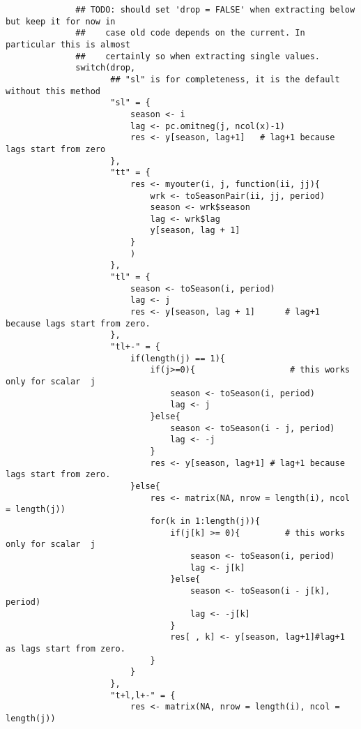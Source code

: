 \documentclass[11pt,a4paper]{article}
\begin{document}
\begin{verbatim}
              ## TODO: should set 'drop = FALSE' when extracting below but keep it for now in
              ##    case old code depends on the current. In particular this is almost
              ##    certainly so when extracting single values.
              switch(drop,
                     ## "sl" is for completeness, it is the default without this method
                     "sl" = {
                         season <- i
                         lag <- pc.omitneg(j, ncol(x)-1)
                         res <- y[season, lag+1]   # lag+1 because lags start from zero
                     },
                     "tt" = {
                         res <- myouter(i, j, function(ii, jj){
                             wrk <- toSeasonPair(ii, jj, period)
                             season <- wrk$season
                             lag <- wrk$lag
                             y[season, lag + 1]
                         }
                         )
                     },
                     "tl" = {
                         season <- toSeason(i, period)
                         lag <- j
                         res <- y[season, lag + 1]      # lag+1 because lags start from zero.
                     },
                     "tl+-" = {
                         if(length(j) == 1){
                             if(j>=0){                   # this works only for scalar  j
                                 season <- toSeason(i, period)
                                 lag <- j
                             }else{
                                 season <- toSeason(i - j, period)
                                 lag <- -j
                             }
                             res <- y[season, lag+1] # lag+1 because lags start from zero.
                         }else{
                             res <- matrix(NA, nrow = length(i), ncol = length(j))
                             for(k in 1:length(j)){
                                 if(j[k] >= 0){         # this works only for scalar  j
                                     season <- toSeason(i, period)
                                     lag <- j[k]
                                 }else{
                                     season <- toSeason(i - j[k], period)
                                     lag <- -j[k]
                                 }
                                 res[ , k] <- y[season, lag+1]#lag+1 as lags start from zero.
                             }
                         }
                     },
                     "t+l,l+-" = {
                         res <- matrix(NA, nrow = length(i), ncol = length(j))

\end{verbatim}
\end{document}
